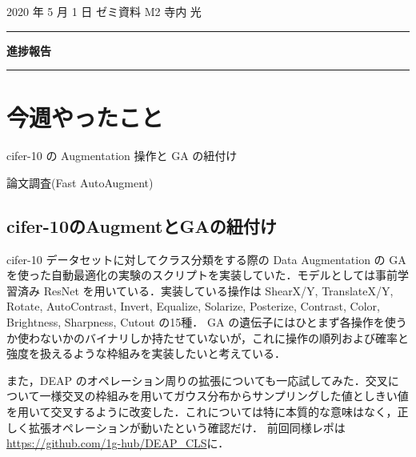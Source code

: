 \documentclass[onecolumn]{ujarticle}   %
\begin{document}
	\noindent

	\hspace{1em}
	2020 年 5 月 1 日
	ゼミ資料
	\hfill
	M2 寺内 光

	\vspace{2mm}

	\hrule

	\begin{center}
		{\Large \bf 進捗報告}
	\end{center}


	\hrule
	\vspace{3mm}

	\section{今週やったこと}
	\begin{itemize}{
		\item{cifer-10 の Augmentation 操作と GA の紐付け}
		\item{論文調査(Fast AutoAugment)}
	}\end{itemize}

	\subsection{cifer-10のAugmentとGAの紐付け}
	cifer-10 データセットに対してクラス分類をする際の Data Augmentation の GA を使った自動最適化の実験のスクリプトを実装していた．モデルとしては事前学習済み ResNet を用いている．実装している操作は ShearX/Y, TranslateX/Y, Rotate, AutoContrast, Invert, Equalize, Solarize, Posterize, Contrast, Color, Brightness, Sharpness, Cutout の15種．
	GA の遺伝子にはひとまず各操作を使うか使わないかのバイナリしか持たせていないが，これに操作の順列および確率と強度を扱えるような枠組みを実装したいと考えている．

	また，DEAP のオペレーション周りの拡張についても一応試してみた．交叉について一様交叉の枠組みを用いてガウス分布からサンプリングした値としきい値を用いて交叉するように改変した．これについては特に本質的な意味はなく，正しく拡張オペレーションが動いたという確認だけ．
	前回同様レポは\url{https://github.com/1g-hub/DEAP_CLS}に．
\end{document}

